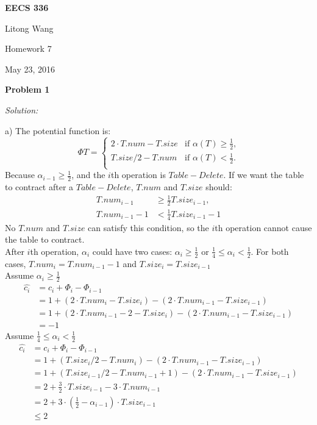 \documentclass[12pt,letterpaper]{article}
\def\pp{\par\noindent}
\newcommand{\problem}[1]{ \bigskip \pp \textbf{Problem #1}\par}
\newcommand{\solution}{\textit{Solution:}\par}
\begin{document}
\centerline{\bf EECS 336}

\medskip
\centerline{Litong Wang}
\centerline{Homework 7}
\centerline{May 23, 2016}
\bigskip


\problem{1}
\solution
a) The potential function is:
\begin{equation}
    \Phi{T}=
   \begin{cases}
   2 \cdot T.num - T.size &\mbox{if $\alpha(T) \ge \frac{1}{2}$,}\\
   T.size / 2 - T.num &\mbox{if $\alpha(T) < \frac{1}{2}$.}\\
   \end{cases}
\end{equation}
Because $\alpha_{i-1} \ge \frac{1}{2}$, and the $i$th operation is $Table-Delete$. If we want the table to contract after a $Table-Delete$, $T.num$ and $T.size$ should:
\begin{align*}
T.num_{i-1} &\ge \frac{1}{2} T.size_{i-1}, \\
T.num_{i-1} - 1 &< \frac{1}{4} T.size_{i-1} - 1
\end{align*}
No $T.num$ and $T.size$ can satisfy this condition, so the $i$th operation cannot cause the table to contract. \\
After $i$th operation, $\alpha_{i}$ could have two cases: $\alpha_{i} \ge \frac{1}{2}$ or $\frac{1}{4} \le \alpha_{i} < \frac{1}{2}$. For both cases, $T.num_{i} = T.num_{i-1} - 1$ and $T.size_{i} = T.size_{i-1}$\\
Assume $\alpha_{i} \ge \frac{1}{2}$
\begin{align*}
\widehat{c_i} &= c_i + \Phi_{i} - \Phi_{i-1} \\
&= 1 + ( 2 \cdot T.num_{i} - T.size_{i} ) - ( 2 \cdot T.num_{i-1} - T.size_{i-1} ) \\
&= 1 + ( 2 \cdot T.num_{i-1} - 2 - T.size_{i} ) - ( 2 \cdot T.num_{i-1} - T.size_{i-1} ) \\
&= -1
\end{align*}
Assume $\frac{1}{4} \le \alpha_{i} < \frac{1}{2}$
\begin{align*}
\widehat{c_i} &= c_i + \Phi_{i} - \Phi_{i-1} \\
&= 1 + ( T.size_{i} / 2 - T.num_{i} ) - ( 2 \cdot T.num_{i-1} - T.size_{i-1} ) \\
&= 1 + ( T.size_{i-1} / 2 - T.num_{i-1} + 1) - ( 2 \cdot T.num_{i-1} - T.size_{i-1} ) \\
&= 2 + \frac{3}{2} \cdot T.size_{i-1} - 3 \cdot T.num_{i-1} \\
&= 2 + 3 \cdot (\frac{1}{2} - \alpha_{i-1}) \cdot T.size_{i-1} \\
&\le 2
\end{align*}
\end{document}
